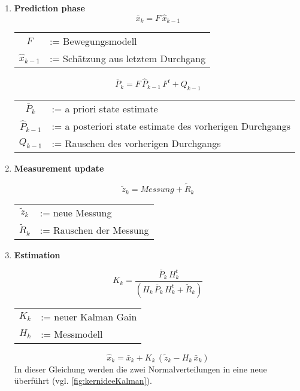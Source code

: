 \begin{enumerate}
	\item \textbf{Prediction phase}
	\begin{equation}
	 \bar{x}_k = F \, \hat{x}_{k-1}
	\end{equation}
	
	\begin{tabular}{cl}
	$F$ &:= Bewegungsmodell \\
	$\hat{x}_{k-1}$ &:= Schätzung aus letztem Durchgang
	\end{tabular}
	
	\begin{equation}
	\bar{P}_k = F \, \hat{P}_{k-1} \, F^t + Q_{k-1}
	\end{equation}
	
	\begin{tabular}{cl}
	$\bar{P}_k$ & := a priori state estimate \\
	$\hat{P}_{k-1}$ & := a posteriori state estimate des vorherigen Durchgangs \\
	$Q_{k-1}$ & := Rauschen des vorherigen Durchgangs \\
	\end{tabular}
	
	
	
	
	\item \textbf{Measurement update}
	
	\begin{equation}
		\tilde{z}_k = Messung + \tilde{R}_k
	\end{equation}
	
	\begin{tabular}{cl}
		$\tilde{z}_k$ & := neue Messung \\
		$\tilde{R}_k$ & := Rauschen der Messung
	\end{tabular}
	
	
	

	\item \textbf{Estimation}
	
	\begin{equation}
	K_k = \frac{\bar{P}_k \, H^t_k} {(H_k \, \bar{P}_k \, H^t_k + \tilde{R}_k)}
	\end{equation}
	\begin{tabular}{cl}
		$K_k$ & := neuer Kalman Gain \\
		$H_k$ & := Messmodell
	\end{tabular}


	\begin{equation}
		\hat{x}_k = \bar{x}_k + K_k \, (\tilde{z}_k - H_k \, \bar{x}_k)
	\end{equation}
	In dieser Gleichung werden die zwei Normalverteilungen in eine neue überführt (vgl. \ref{fig:kernideeKalman}). 
	

\end{enumerate}
